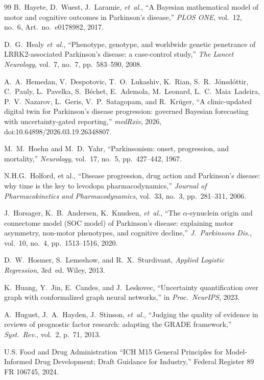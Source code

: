 \begin{thebibliography}{99}
B.~Hayete, D.~Wuest, J.~Laramie, \textit{et~al.}, ``A Bayesian mathematical model of motor and cognitive outcomes in Parkinson's disease,'' \textit{PLOS ONE}, vol.~12, no.~6, Art.\ no.~e0178982, 2017.

D.~G.~Healy \textit{et~al.}, ``Phenotype, genotype, and worldwide genetic penetrance of LRRK2-associated Parkinson's disease: a case-control study,'' \textit{The Lancet Neurology}, vol.~7, no.~7, pp.~583--590, 2008.

A.~A.~Hemedan, V.~Despotovic, T.~O.~Lukashiv, K.~Rian, S.~R.~J{\'o}nsd{\'o}ttir, C.~Pauly, L.~Pavelka, S.~B{\'e}chet, E.~Ademola, M.~Leonard, L.~C.~Maia~Ladeira, P.~V.~Nazarov, L.~Geris, V.~P.~Satagopam, and R.~Kr{\"u}ger, ``A clinic-updated digital twin for Parkinson's disease progression: governed Bayesian forecasting with uncertainty-gated reporting,'' \textit{medRxiv}, 2026, doi:10.64898/2026.03.19.26348807.

M.~M.~Hoehn and M.~D.~Yahr, ``Parkinsonism: onset, progression, and mortality,'' \textit{Neurology}, vol.~17, no.~5, pp.~427--442, 1967.

N.H.G.~Holford, et al., ``Disease progression, drug action and Parkinson's disease: why time is the key to levodopa pharmacodynamics,'' \textit{Journal of Pharmacokinetics and Pharmacodynamics}, vol.~33, no.~3, pp.~281--311, 2006.

J.~Horsager, K.~B.~Andersen, K.~Knudsen, \textit{et~al.}, ``The $\alpha$-synuclein origin and connectome model (SOC model) of Parkinson's disease: explaining motor asymmetry, non-motor phenotypes, and cognitive decline,'' \textit{J.\ Parkinsons Dis.}, vol.~10, no.~4, pp.~1513--1516, 2020.

D.~W.~Hosmer, S.~Lemeshow, and R.~X.~Sturdivant, \textit{Applied Logistic Regression}, 3rd~ed. Wiley, 2013.

K.~Huang, Y.~Jin, E.~Candes, and J.~Leskovec, ``Uncertainty quantification over graph with conformalized graph neural networks,'' in \textit{Proc.\ NeurIPS}, 2023.

A.~Huguet, J.~A.~Hayden, J.~Stinson, \textit{et~al.}, ``Judging the quality of evidence in reviews of prognostic factor research: adapting the GRADE framework,'' \textit{Syst.\ Rev.}, vol.~2, p.~71, 2013.


 U.S. Food and Drug Administration ``ICH M15 General Principles for Model-Informed Drug Development; Draft Guidance for Industry,'' Federal Register 89 FR 106745, 2024.


\end{thebibliography}

